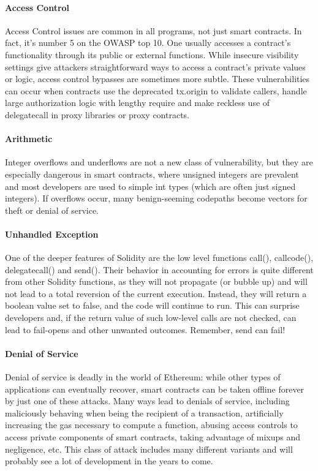             \paragraph{Access Control}
            
            Access Control issues are common in all programs, not just smart contracts.
            In fact, it's number 5 on the OWASP top 10. One usually accesses a contract's functionality through its public or external functions.
            While insecure visibility settings give attackers straightforward ways to access a contract's private values or logic, access control bypasses are sometimes more subtle.
            These vulnerabilities can occur when contracts use the deprecated tx.origin to validate callers, handle large authorization logic with lengthy require and make reckless use of
            delegatecall in proxy libraries or proxy contracts.

            \paragraph{Arithmetic}
            Integer overflows and underflows are not a new class of vulnerability, but they are especially dangerous in smart contracts, where unsigned integers are prevalent and most developers are used to simple int types (which are often just signed integers). If overflows occur, many benign-seeming codepaths become vectors for theft or denial of service.
            
            \paragraph{Unhandled Exception}
            One of the deeper features of Solidity are the low level functions call(), callcode(), delegatecall() and send(). Their behavior in accounting for errors is quite different from other Solidity functions, as they will not propagate (or bubble up) and will not lead to a total reversion of the current execution. Instead, they will return a boolean value set to false, and the code will continue to run. This can surprise developers and, if the return value of such low-level calls are not checked, can lead to fail-opens and other unwanted outcomes. Remember, send can fail!
            
            \paragraph{Denial of Service}
            Denial of service is deadly in the world of Ethereum: while other types of applications can eventually recover, smart contracts can be taken offline forever by just one of these attacks. Many ways lead to denials of service, including maliciously behaving when being the recipient of a transaction, artificially increasing the gas necessary to compute a function, abusing access controls to access private components of smart contracts, taking advantage of mixups and negligence, etc. This class of attack includes many different variants and will probably see a lot of development in the years to come.
            
